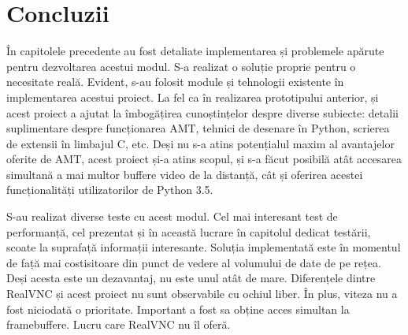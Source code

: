 
 \chapter{Concluzii}
\label{cap:concluzii}
%
%
% 
% 
%
%

În capitolele precedente au fost detaliate implementarea și problemele apărute pentru dezvoltarea acestui modul. S-a realizat o soluție proprie pentru o necesitate reală. Evident, s-au folosit module și tehnologii existente în implementarea acestui proiect. La fel ca în realizarea prototipului anterior, și acest proiect a ajutat la îmbogățirea cunoștințelor despre diverse subiecte: detalii suplimentare despre funcționarea AMT, tehnici de desenare în Python, scrierea de extensii în limbajul C, etc. Deși nu s-a atins potențialul maxim al avantajelor oferite de AMT, acest proiect și-a atins scopul, și s-a făcut posibilă atât accesarea simultană a mai multor buffere video de la distanță, cât și oferirea acestei funcționalități utilizatorilor de Python 3.5.  

S-au realizat diverse teste cu acest modul. Cel mai interesant test de performanță, cel prezentat și în această lucrare în capitolul dedicat testării, scoate la suprafață informații interesante. Soluția implementată este în momentul de față mai costisitoare din punct de vedere al volumului de date de pe rețea. Deși acesta este un dezavantaj, nu este unul atât de mare. Diferențele dintre RealVNC și acest proiect nu sunt observabile cu ochiul liber. În plus, viteza nu a fost niciodată o prioritate. Important a fost sa obține acces simultan la framebuffere. Lucru care RealVNC nu îl oferă.

